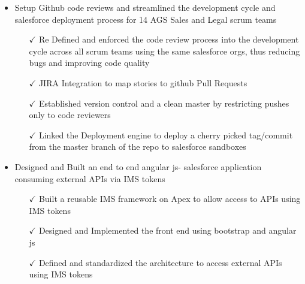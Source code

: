 \begin{itemize} \itemsep -2pt %
 \item Setup Github code reviews and streamlined the development cycle and salesforce deployment process for 14 AGS Sales and Legal scrum teams \itemsep -2pt
   \begin{itemize}
     \item[$\checkmark$]  \itemsep -8pt%
   Re Defined and enforced the code review process into the development cycle across all scrum teams using the same salesforce orgs, thus reducing bugs and improving code quality\\
      \item[$\checkmark$]  \itemsep -8pt%
 JIRA Integration to map stories to github Pull Requests\\
     \item[$\checkmark$]  \itemsep -8pt%
    Established version control and a clean master by restricting pushes only to code reviewers\\
    \item[$\checkmark$]  \itemsep -8pt%
    Linked the Deployment engine to deploy a cherry picked tag/commit from the master branch of the repo to salesforce sandboxes\\
      \end{itemize}       
\end{itemize}

\begin{itemize} \itemsep -2pt %
 \item  Designed and Built an end to end angular js- salesforce application consuming external APIs via IMS tokens \itemsep -2pt
   \begin{itemize}
     \item[$\checkmark$]  \itemsep -8pt%
   Built a reusable IMS framework on Apex to allow access to APIs using IMS tokens\\
     \item[$\checkmark$]  \itemsep -8pt%
  Designed and Implemented the front end using bootstrap and angular js\\
   \item[$\checkmark$]  \itemsep -8pt%
  Defined and standardized the architecture to access external APIs using IMS tokens\\
      \end{itemize}       
\end{itemize}

